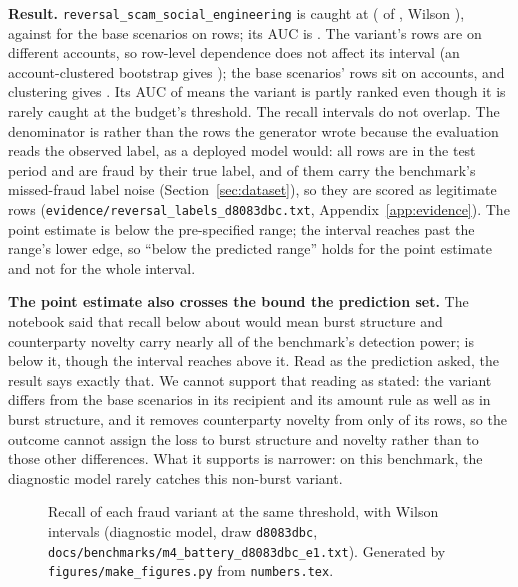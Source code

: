 \textbf{Result.} \texttt{reversal\_scam\_social\_engineering} is caught at \nRevRecall{}
(\nRevCaught{} of \nRevFraud{}, Wilson \nRevCI{}), against \nBaseVarRecall{} \nBaseVarCI{} for the
base scenarios on \nBaseVarFraud{} rows; its AUC is \nRevAUC{}. The variant's \nRevFraud{} rows are on
\nRevAccounts{} different accounts, so row-level dependence does not affect its interval (an
account-clustered bootstrap gives \nCluRevci{}); the base scenarios' rows sit on \nBaseAccounts{}
accounts, and clustering gives \nCluBaseci{}. Its AUC of \nRevAUC{} means the variant is partly ranked even
though it is rarely caught at the budget's threshold. The recall intervals do not overlap. The denominator is \nRevFraud{}
rather than the \nRevRows{} rows the generator wrote because the evaluation reads the observed
label, as a deployed model would: all \nRevTrueFraud{} rows are in the test period and are fraud by
their true label, and \nRevScoredUnlabelled{} of them carry the benchmark's missed-fraud label noise
(Section~\ref{sec:dataset}), so they are scored as legitimate rows
(\texttt{evidence/\allowbreak reversal\_\allowbreak labels\_\allowbreak d8083dbc.txt},
Appendix~\ref{app:evidence}). The point estimate is below the pre-specified range; the interval
reaches past the range's lower edge, so ``below the predicted range'' holds for the point estimate
and not for the whole interval.

\textbf{The point estimate also crosses the bound the prediction set.} The notebook said that recall
below about \nRevPredFloor{} would mean burst structure and counterparty novelty carry nearly all of
the benchmark's detection power; \nRevRecall{} is below it, though the interval \nRevCI{} reaches
above it. Read as the prediction asked, the result says exactly that. We cannot support that reading
as stated: the variant differs from the base scenarios in its recipient and its amount rule as well as
in burst structure, and it removes counterparty novelty from only \nRevNotNovelScored{} of its
\nRevFraud{} rows, so the outcome cannot assign the loss to burst structure and novelty rather than to
those other differences. What it supports is narrower: on this benchmark, the diagnostic model rarely
catches this non-burst variant.

\begin{figure}[htbp]
\centering

\caption{Recall of each fraud variant at the same threshold, with Wilson intervals (diagnostic
model, draw \texttt{d8083dbc}, \texttt{docs/benchmarks/m4\_battery\_d8083dbc\_e1.txt}). Generated by
\texttt{figures/make\_figures.py} from \texttt{numbers.tex}.}
\label{fig:variants}
\end{figure}

